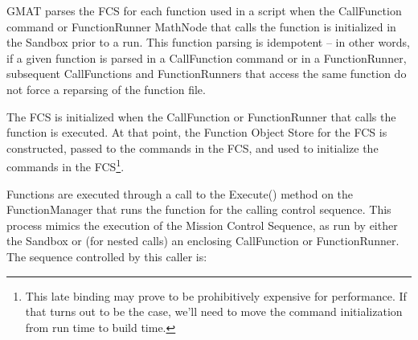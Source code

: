 GMAT parses the FCS for each function used in a script when the CallFunction command or
FunctionRunner MathNode that calls the function is initialized in the Sandbox prior to a run.  This
function parsing is idempotent -- in other words, if a given function is parsed in a CallFunction
command or in a FunctionRunner, subsequent CallFunctions and FunctionRunners that access the same
function do not force a reparsing of the function file.

The FCS is initialized when the CallFunction or FunctionRunner that calls the function is executed. 
At that point, the Function Object Store for the FCS is constructed, passed to the commands in the
FCS, and used to initialize the commands in the FCS\footnote{This late binding may prove to be
prohibitively expensive for performance.  If that turns out to be the case, we'll need to move the
command initialization from run time to build time.}.

Functions are executed through a call to the Execute() method on the FunctionManager that runs
the function for the calling control sequence.  This process mimics the execution of the Mission
Control Sequence, as run by either the Sandbox or (for nested calls) an enclosing CallFunction or
FunctionRunner.  The sequence controlled by this caller is:

